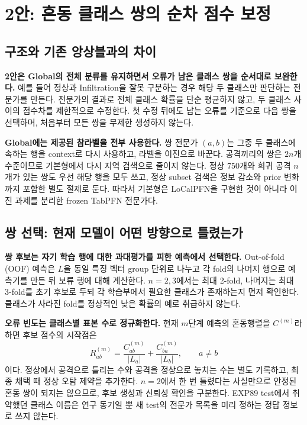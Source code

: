 \section{2안: 혼동 클래스 쌍의 순차 점수 보정}
\subsection{구조와 기존 앙상블과의 차이}
\textbf{2안은 Global의 전체 분류를 유지하면서 오류가 남은 클래스 쌍을 순서대로 보완한다.} 예를 들어 정상과 Infiltration을 잘못 구분하는 경우 해당 두 클래스만 판단하는 전문가를 만든다. 전문가의 결과로 전체 클래스 확률을 단순 평균하지 않고, 두 클래스 사이의 점수차를 제한적으로 수정한다. 첫 수정 뒤에도 남는 오류를 기준으로 다음 쌍을 선택하며, 처음부터 모든 쌍을 무제한 생성하지 않는다.


\textbf{Global에는 제공된 참라벨을 전부 사용한다.} 쌍 전문가 $(a,b)$는 그중 두 클래스에 속하는 행을 context로 다시 사용하고, 라벨을 이진으로 바꾼다. 공격끼리의 쌍은 $2n$개 수준이므로 기본형에서 다시 지역 검색으로 줄이지 않는다. 정상 750개와 희귀 공격 $n$개가 있는 쌍도 우선 해당 행을 모두 쓰고, 정상 subset 검색은 정보 감소와 prior 변화까지 포함한 별도 절제로 둔다. 따라서 기본형은 LoCalPFN을 구현한 것이 아니라 이진 과제를 분리한 frozen TabPFN 전문가다.

\subsection{쌍 선택: 현재 모델이 어떤 방향으로 틀렸는가}
\textbf{쌍 후보는 자기 학습 행에 대한 과대평가를 피한 예측에서 선택한다.} Out-of-fold (OOF) 예측은 $L$을 동일 특징 벡터 group 단위로 나누고 각 fold의 나머지 행으로 예측기를 만든 뒤 보류 행에 대해 계산한다. $n=2,3$에서는 최대 2-fold, 나머지는 최대 3-fold를 초기 후보로 두되 각 학습부에서 필요한 클래스가 존재하는지 먼저 확인한다. 클래스가 사라진 fold를 정상적인 낮은 확률의 예로 취급하지 않는다.

\textbf{오류 빈도는 클래스별 표본 수로 정규화한다.} 현재 $m$단계 예측의 혼동행렬을 $C^{(m)}$라 하면 후보 점수의 시작점은
\begin{equation}
 R_{ab}^{(m)}=\frac{C_{ab}^{(m)}}{|L_a|}
                  +\frac{C_{ba}^{(m)}}{|L_b|},\qquad a\ne b
\end{equation}
이다. 정상에서 공격으로 틀리는 수와 공격을 정상으로 놓치는 수는 별도 기록하고, 최종 채택 때 정상 오탐 제약을 추가한다. $n=2$에서 한 번 틀렸다는 사실만으로 안정된 혼동 쌍이 되지는 않으므로, 후보 생성과 신뢰성 확인을 구분한다. EXP89 test에서 취약했던 클래스 이름은 연구 동기일 뿐 새 test의 전문가 목록을 미리 정하는 정답 정보로 쓰지 않는다.

